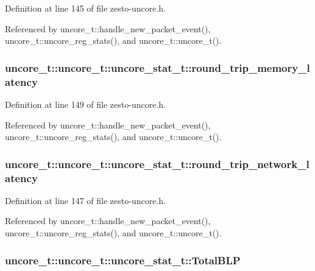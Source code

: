 Definition at line 145 of file zesto-uncore.h.

Referenced by uncore\_\-t::handle\_\-new\_\-packet\_\-event(), uncore\_\-t::uncore\_\-reg\_\-stats(), and uncore\_\-t::uncore\_\-t().
\subsubsection[{round\_\-trip\_\-memory\_\-latency}]{ uncore\_\-t::uncore\_\-t::uncore\_\-stat\_\-t::round\_\-trip\_\-memory\_\-latency}\label{structuncore__t_1_1uncore__stat__t_e10c22cb42709a5518132d7383a5adcc}




Definition at line 149 of file zesto-uncore.h.

Referenced by uncore\_\-t::handle\_\-new\_\-packet\_\-event(), uncore\_\-t::uncore\_\-reg\_\-stats(), and uncore\_\-t::uncore\_\-t().
\subsubsection[{round\_\-trip\_\-network\_\-latency}]{ uncore\_\-t::uncore\_\-t::uncore\_\-stat\_\-t::round\_\-trip\_\-network\_\-latency}\label{structuncore__t_1_1uncore__stat__t_9725f11a9762ce80f955149ab178fa89}




Definition at line 147 of file zesto-uncore.h.

Referenced by uncore\_\-t::handle\_\-new\_\-packet\_\-event(), uncore\_\-t::uncore\_\-reg\_\-stats(), and uncore\_\-t::uncore\_\-t().
\subsubsection[{TotalBLP}]{ uncore\_\-t::uncore\_\-t::uncore\_\-stat\_\-t::TotalBLP}\label{structuncore__t_1_1uncore__stat__t_48b972fd76da0edcba656136509ec1db}




